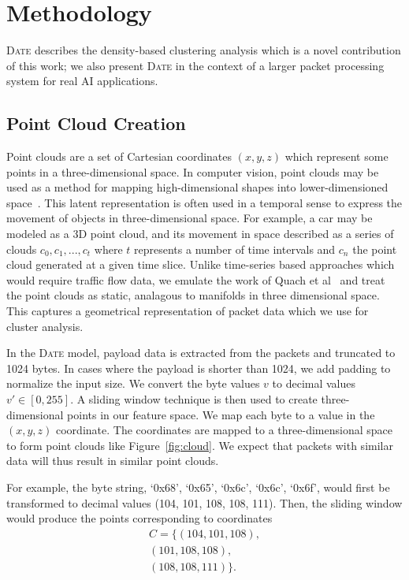 \section{Methodology}

\textsc{Date} describes the density-based clustering analysis which is a novel contribution of this work; we also present \textsc{Date} in the context of a larger packet processing system for real AI applications.

\subsection{Point Cloud Creation}
Point clouds are a set of Cartesian coordinates $(x, y, z)$ which represent some points in a three-dimensional space. In computer vision, point clouds may be used as a method for mapping high-dimensional shapes into lower-dimensioned space~\cite{Wang_2019_ICCV}. This latent representation is often used in a temporal sense to express the movement of objects in three-dimensional space. For example, a car may be modeled as a 3D point cloud, and its movement in space described as a series of clouds ${c_0, c_1,...,c_t}$ where $t$ represents a number of time intervals and $c_n$ the point cloud generated at a given time slice. Unlike time-series based approaches which would require traffic flow data, we emulate the work of Quach et al~\cite{Quach2020compression} and treat the point clouds as static, analagous to manifolds in three dimensional space. This captures a geometrical representation of packet data which we use for cluster analysis.

In the \textsc{Date} model, payload data is extracted from the packets and truncated to 1024 bytes. In cases where the payload is shorter than 1024, we add padding to normalize the input size. We convert the byte values $v$ to decimal values $v' \in [0,255]$. A sliding window technique is then used to create three-dimensional points in our feature space. We map each byte to a value in the $(x, y, z)$ coordinate. The coordinates are mapped to a three-dimensional space to form point clouds like Figure~\ref{fig:cloud}. We expect that packets with similar data will thus result in similar point clouds.

For example, the byte string, `0x68', `0x65', `0x6c', `0x6c', `0x6f', would first be transformed to decimal values (104, 101, 108, 108, 111). Then, the sliding window would produce the points corresponding to coordinates
\begin{equation}
\begin{split}
     C =
\{(104, 101, 108), \\ (101, 108, 108), \\ (108, 108, 111)\}.
\end{split}
\end{equation}

